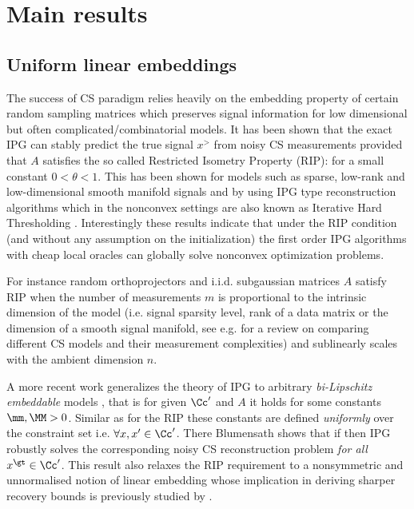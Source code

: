 \section{Main results}
\label{sec:main}
\subsection{Uniform linear embeddings}
The success of CS paradigm relies heavily on 
the embedding property of certain random sampling matrices which preserves signal information for low dimensional but often complicated/combinatorial models. It has been shown that the exact IPG can stably predict the true signal $x^\gt$ from noisy CS measurements provided that $A$ satisfies the so called Restricted Isometry Property (RIP): 
for a small constant  $0<\theta<1$.
This has been shown for models such as sparse, low-rank and low-dimensional smooth manifold signals and by using 
IPG type reconstruction 
algorithms which in the nonconvex settings are also known as Iterative Hard Thresholding \cite{IHTCS, Ma2011, AIHT,MIP, modelbasedCS}. Interestingly these results indicate that under the RIP condition (and without any assumption on the initialization) the first order IPG algorithms with cheap local oracles can globally solve
nonconvex optimization problems. 

For instance random orthoprojectors and i.i.d. subgaussian matrices $A$ satisfy RIP when the number of measurements $m$ is proportional to the intrinsic dimension of the model (i.e. signal sparsity level, rank of a data matrix or the dimension of a smooth signal manifold, see e.g. \cite{RichCSreview} for a review on comparing different CS models and their measurement complexities) and sublinearly scales with the ambient dimension $n$. 

A more recent work generalizes the theory of IPG to arbitrary \emph{bi-Lipschitz embeddable} models \cite{Blumen}, that is for given $\Cc'$ and $A$ it holds
for some constants $\mm, \MM >0$. Similar as for the RIP these constants are defined \emph{uniformly} over the constraint set i.e. $\forall x,x'\in \Cc'$. There Blumensath shows that if \eq{\MM<1.5\mm,} then IPG robustly solves the corresponding noisy CS reconstruction problem \emph{for all} $x^\gt\in \Cc'$. This result also relaxes the RIP requirement to a nonsymmetric and unnormalised notion of linear embedding whose implication in deriving sharper recovery bounds is previously studied by \cite{JaredJeff}. 

